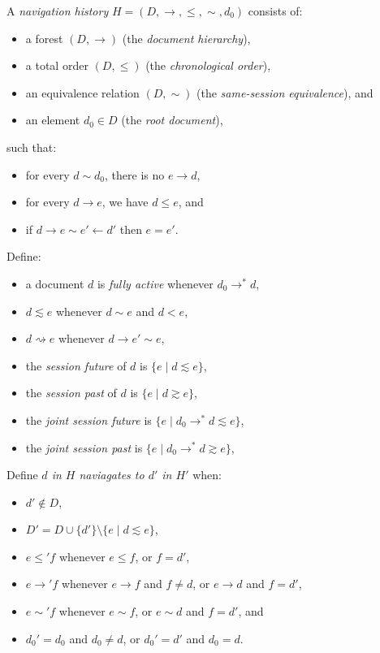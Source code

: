 \documentclass{article}
\newcommand{\aNH}{H}
\newcommand{\Docs}{D}
\newcommand{\parentOf}{\rightarrow}
\newcommand{\childOf}{\leftarrow}
\newcommand{\leChron}{\le}
\newcommand{\ltChron}{<}
\newcommand{\eqSess}{\sim}
\newcommand{\ltSess}{\lesssim}
\newcommand{\gtSess}{\gtrsim}
\newcommand{\parentOfSess}{\rightsquigarrow}
\newcommand{\rootDoc}{d_0}
\newcommand{\aDoc}{d}
\newcommand{\bDoc}{e}
\newcommand{\cDoc}{f}
\begin{document}
A \emph{navigation history} $\aNH=(\Docs,{\parentOf},{\leChron},{\eqSess},{\rootDoc})$ consists of:
\begin{itemize}
\item a forest $(\Docs,{\parentOf})$ (the \emph{document hierarchy}),
\item a total order $(\Docs,{\leChron})$ (the \emph{chronological order}),
\item an equivalence relation $(\Docs,{\eqSess})$ (the \emph{same-session equivalence}), and
\item an element $\rootDoc \in \Docs$ (the \emph{root document}),
\end{itemize}
such that:
\begin{itemize}
\item for every $\aDoc \eqSess \rootDoc$, there is no $\bDoc \parentOf \aDoc$,
\item for every $\aDoc \parentOf \bDoc$, we have $\aDoc \leChron \bDoc$, and
\item if $\aDoc \parentOf \bDoc \eqSess \bDoc' \childOf \aDoc'$
   then $\bDoc=\bDoc'$.
\end{itemize}
Define:
\begin{itemize}
\item a document $\aDoc$ is \emph{fully active} whenever $\rootDoc \parentOf^* \aDoc$,
\item $\aDoc \ltSess \bDoc$ whenever $\aDoc \eqSess \bDoc$ and $\aDoc \ltChron \bDoc$,
\item $\aDoc \parentOfSess \bDoc$ whenever $\aDoc \parentOf \bDoc' \eqSess \bDoc$,
\item the \emph{session future} of $\aDoc$ is $\{ \bDoc \mid \aDoc \ltSess \bDoc \}$,
\item the \emph{session past} of $\aDoc$ is $\{ \bDoc \mid \aDoc \gtSess \bDoc \}$,
\item the \emph{joint session future} is $\{ \bDoc \mid \rootDoc \parentOf^* \aDoc \ltSess \bDoc \}$,
\item the \emph{joint session past} is $\{ \bDoc \mid \rootDoc \parentOf^* \aDoc \gtSess \bDoc \}$,
\end{itemize}
Define \emph{$\aDoc$ in $\aNH$ naviagates to $\aDoc'$ in $\aNH'$} when:
\begin{itemize}
\item $\aDoc'\notin\Docs$,
\item $\Docs' = \Docs \cup \{\aDoc'\} \setminus \{ \bDoc \mid \aDoc \ltSess \bDoc \}$,
\item $\bDoc \leChron' \cDoc$ whenever
  $\bDoc \leChron \cDoc$, or $\cDoc = \aDoc'$,
\item $\bDoc \parentOf' \cDoc$ whenever
  $\bDoc \parentOf \cDoc$ and $\cDoc \neq \aDoc$, or
  $\bDoc \parentOf \aDoc$ and $\cDoc = \aDoc'$,
\item $\bDoc \eqSess' \cDoc$ whenever
  $\bDoc \eqSess \cDoc$, or
  $\bDoc \eqSess \aDoc$ and $\cDoc = \aDoc'$, and
\item $\rootDoc' = \rootDoc$ and $\rootDoc \neq \aDoc$, or
  $\rootDoc' = \aDoc'$ and $\rootDoc = \aDoc$.
\end{itemize}
\end{document}
